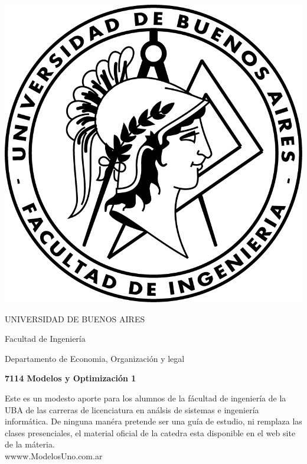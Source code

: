 \documentclass[12pt]{book}
\begin{document}
\thispagestyle{empty}

\begin {center}

\includegraphics[scale=.4]{Logo-fiuba_big.png}

\medskip
UNIVERSIDAD DE BUENOS AIRES

Facultad de Ingenier\'ia

Departamento de Economia, Organizaci\'on y legal


\vspace{3cm}


\textbf{\large 7114 Modelos y Optimizaci\'on 1}

\vspace{2cm}


Este es un modesto aporte para los alumnos de la f\'acultad de ingenier\'ia  de la UBA de las carreras de licenciatura en an\'alsis de sistemas e ingenier\'ia inform\'atica.
De ninguna man\'era pretende ser una gu\'ia de estudio, ni remplaza las clases presenciales, el material oficial de la catedra esta disponible en el web site de la m\'ateria.
\\
wwww.ModelosUno.com.ar

\end {center}


\vspace{2.5cm}
\end{document}

